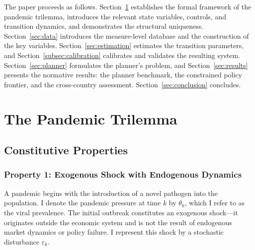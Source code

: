 \documentclass[12pt, a4paper]{article}
\begin{document}
\noindent The paper proceeds as follows. Section~\ref{sec:trilemma} establishes the formal framework of the pandemic trilemma, introduces the relevant state variables, controls, and transition dynamics, and demonstrates the structural uniqueness. Section~\ref{sec:data} introduces the measure-level database and the construction of the key variables. Section~\ref{sec:estimation} estimates the transition parameters, and Section~\ref{subsec:calibration} calibrates and validates the resulting system. Section~\ref{sec:planner} formulates the planner's problem, and
Section~\ref{sec:results} presents the normative results: the planner benchmark, the constrained policy frontier, and the cross-country assessment. Section~\ref{sec:conclusion} concludes.

\newpage

\section{The Pandemic Trilemma}
\label{sec:trilemma}


\subsection{Constitutive Properties}
\label{subsec:properties}


\subsubsection*{Property 1: Exogenous Shock with Endogenous Dynamics}


A pandemic begins with the introduction of a novel pathogen into the population. I denote the pandemic pressure at time $k$ by $\theta_k$, which I refer to as the viral prevalence. The initial outbreak constitutes an exogenous shock---it originates outside the economic system and is not the result of endogenous market dynamics or policy failure. I represent this shock by a stochastic disturbance $\varepsilon_k$.
\end{document}
